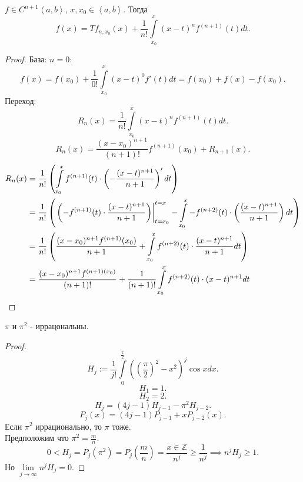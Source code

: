 \documentclass[11pt, oneside]{article}   	%
\begin{document}
\begin{definition}
    $f\in C^{n+1}\left<a, b\right>$, $x, x_0\in \left<a, b\right>$. Тогда
    \[ f(x) = Tf_{n,x_0}(x) + \frac{1}{n!} \int\limits_{x_0}^{x} (x-t)^{n}f^{(n+1)}(t) dt  .\]
    \begin{proof}
        База: $n=0$:
        \[ f(x) = f(x_0) + \frac{1}{0!} \int\limits_{x_0}^{x} (x-t)^{0} f'(t) dt = f(x_0) + f(x) - f(x_0)  .\]
        Переход:
        \[ R_n(x) = \frac{1}{n!} \int\limits_{x_0}^{x} (x-t)^{n}f^{(n+1)}(t)dt  .\]
        \[ R_{n}(x) = \frac{(x-x_0)^{n+1}}{(n+1)!} f^{(n+1)}(x_0) + R_{n+1}(x) .\]
        \begin{equation*}
            \begin{split}
                R_n(x) &= \frac{1}{n!}\left( \int\limits_{x_0}^{x} f^{(n+1)}(t) \cdot \left( - \frac{(x-t)^{n+1}}{n+1} \right)'dt   \right)\\
                       &= \frac{1}{n!}\left( \left.\left(-f^{(n+1)}(t) \cdot \frac{(x-t)^{n+1}}{n+1}\right)\right|_{t=x_0}^{t=x} - \int\limits_{x_0}^{x} -f^{(n+2)}(t) \cdot  \left( \frac{(x-t)^{n+1}}{n+1} \right)dt    \right)\\
                       &= \frac{1}{n!}\left( \frac{(x-x_0)^{n+1}f^{(n+1)}(x_0)}{n+1} + \int\limits_{x_0}^{x} f^{(n+2)}(t) \cdot \frac{(x-t)^{n+1}}{n+1} dt \right)\\
                       &= \frac{(x-x_0)^{n+1}f^{(n+1)(x_0)}}{(n+1)!} + \frac{1}{(n+1)!} \int\limits_{x_0}^{x} f^{(n+2)}(t) \cdot (x-t)^{n+1} dt \qedhere 
            \end{split}
        \end{equation*}
    \end{proof}
\end{definition}
\begin{theorem}
    $\pi$ и $\pi^2$ - иррацональны.\\
    \begin{proof}
        \[ H_j := \frac{1}{j!} \int\limits_{0}^{\frac{\pi}{2}} \left( \left( \frac{\pi}{2} \right)^2 - x^2  \right)^{j}\cos x dx    .\]
        \[ H_1 = 1 .\]
        \[ H_2 = 2 .\] 
        \[ H_j = (4j-1)H_{j-1} - \pi^2 H_{j-2} .\]
        \[ P_j(x) = (4j-1)P_{j-1} + xP_{j-2}(x).\] 
        Если $\pi^2$ иррационально, то $\pi$ тоже.\\
        Предположим что $\pi^2 = \frac{m}{n}$.\\
        \[ 0 < H_j = P_j(\pi^2) = P_j\left( \frac{m}{n} \right) = \frac{x\in \mathbb{Z}}{n^{j}} \ge \frac{1}{n^{j}} \implies n^{j}H_j \ge 1 .\]
        Но $\lim\limits_{j \to \infty} n^{j}H_j = 0$.
    \end{proof}
\end{theorem}
\end{document}

